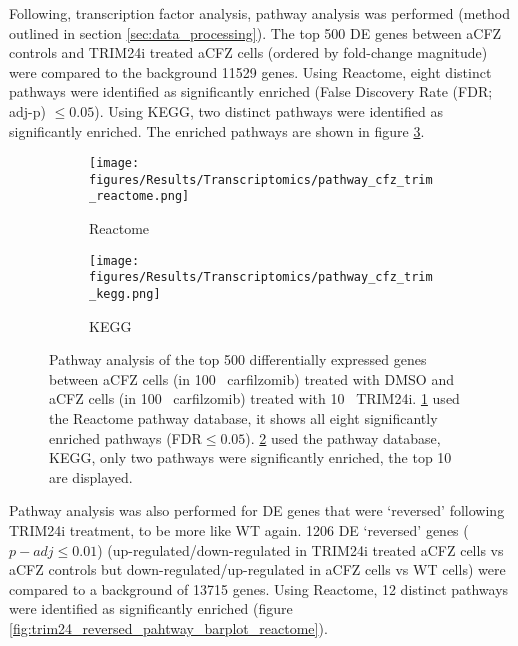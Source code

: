 
Following, transcription factor analysis, pathway analysis was performed (method outlined in section \ref{sec:data_processing}).
The top 500 DE genes between aCFZ controls and TRIM24i treated aCFZ cells (ordered by fold-change magnitude) were compared to the background 11529 genes.
Using Reactome, eight distinct pathways were identified as significantly enriched (False Discovery Rate (FDR; adj-p) $\leq0.05$).
Using KEGG, two distinct pathways were identified as significantly enriched.
The enriched pathways are shown in figure \ref{fig:pathway_cfz_trim_barplots}.

\begin{figure}[htb]
\begin{subfigure}[t]{0.5\textwidth}
    \texttt{[image: figures/Results/Transcriptomics/pathway\_cfz\_trim\_reactome.png]}
    \caption{Reactome}
    \label{fig:pathway_barplot_cfz_trim_reactome}
\end{subfigure}
%
\begin{subfigure}[t]{0.5\textwidth}
    \texttt{[image: figures/Results/Transcriptomics/pathway\_cfz\_trim\_kegg.png]}
    \caption{KEGG}
    \label{fig:pathway_barplot_cfz_trim_kegg}
\end{subfigure}
    \caption[Enriched pathways- aCFZ TRIM24i vs WT]{Pathway analysis of the top 500 differentially expressed genes between aCFZ cells (in 100\si{\nano\Molar} carfilzomib) treated with DMSO and aCFZ cells (in 100\si{\nano\Molar} carfilzomib) treated with 10\si{\micro\Molar} TRIM24i. \ref{fig:pathway_barplot_cfz_trim_reactome} used the Reactome pathway database, it shows all eight significantly enriched pathways (FDR$\leq0.05$). \ref{fig:pathway_barplot_cfz_trim_kegg} used the pathway database, KEGG, only two pathways were significantly enriched, the top 10 are displayed.}
\label{fig:pathway_cfz_trim_barplots}
\end{figure}

Pathway analysis was also performed for DE genes that were `reversed' following TRIM24i treatment, to be more like WT again.
1206 DE `reversed' genes ($p-adj\leq0.01$) (up-regulated/down-regulated in TRIM24i treated aCFZ cells vs aCFZ controls but down-regulated/up-regulated in aCFZ cells vs WT cells) were compared to a background of 13715 genes.
Using Reactome, 12 distinct pathways were identified as significantly enriched (figure \ref{fig:trim24_reversed_pahtway_barplot_reactome}).



